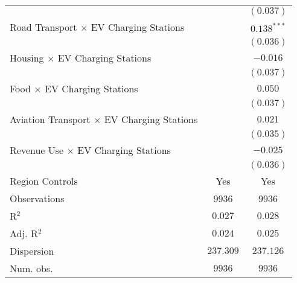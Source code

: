 \begin{center}
\begin{tiny}
\begin{longtable}{l@{} c@{} c@{}}
                                                         &                  & $(0.037)$        \\
\quad Road Transport $\times$ EV Charging Stations       &                  & $0.138^{***}$    \\
                                                         &                  & $(0.036)$        \\
\quad Housing $\times$ EV Charging Stations              &                  & $-0.016$         \\
                                                         &                  & $(0.037)$        \\
\quad Food $\times$ EV Charging Stations                 &                  & $0.050$          \\
                                                         &                  & $(0.037)$        \\
\quad Aviation Transport $\times$ EV Charging Stations   &                  & $0.021$          \\
                                                         &                  & $(0.035)$        \\
\quad Revenue Use $\times$ EV Charging Stations          &                  & $-0.025$         \\
                                                         &                  & $(0.036)$        \\
\hline
Region Controls                                          & Yes              & Yes              \\
Observations                                             & 9936             & 9936             \\
R$^2$                                                    & $0.027$          & $0.028$          \\
Adj. R$^2$                                               & $0.024$          & $0.025$          \\
Dispersion                                               & $237.309$        & $237.126$        \\
Num. obs.                                                & $9936$           & $9936$           \\
\end{longtable}
\end{tiny}
\end{center}
